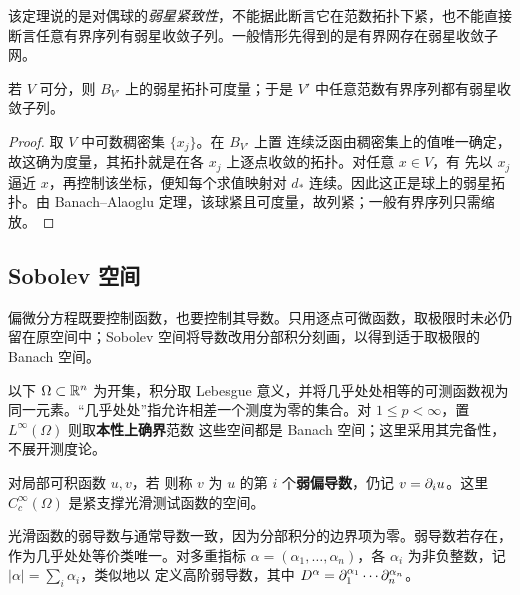 \begin{remark}
    该定理说的是对偶球的\emph{弱星紧致性}，不能据此断言它在范数拓扑下紧，也不能直接断言任意有界序列有弱星收敛子列。一般情形先得到的是有界网存在弱星收敛子网。
\end{remark}

\begin{theorem}
    若 $V$ 可分，则 $B_{V'}$ 上的弱星拓扑可度量；于是 $V'$ 中任意范数有界序列都有弱星收敛子列。
\end{theorem}
\begin{proof}
    取 $V$ 中可数稠密集 $\{x_j\}$。在 $B_{V'}$ 上置
    连续泛函由稠密集上的值唯一确定，故这确为度量，其拓扑就是在各 $x_j$ 上逐点收敛的拓扑。对任意 $x\in V$，有
    先以 $x_j$ 逼近 $x$，再控制该坐标，便知每个求值映射对 $d_*$ 连续。因此这正是球上的弱星拓扑。由 Banach--Alaoglu 定理，该球紧且可度量，故列紧；一般有界序列只需缩放。
\end{proof}

\subsection{Sobolev 空间}\label{sec:sobolev-spaces}

偏微分方程既要控制函数，也要控制其导数。只用逐点可微函数，取极限时未必仍留在原空间中；Sobolev 空间将导数改用分部积分刻画，以得到适于取极限的 Banach 空间。

以下 $\Omega\subset\mathbb{R}^n$ 为开集，积分取 Lebesgue 意义，并将几乎处处相等的可测函数视为同一元素。“几乎处处”指允许相差一个测度为零的集合。对 $1\leqslant p<\infty$，置
$L^\infty(\Omega)$ 则取\textbf{本性上确界}范数
这些空间都是 Banach 空间；这里采用其完备性，不展开测度论。

\begin{definition}\label{def:weak-derivative}
    对局部可积函数 $u,v$，若
    则称 $v$ 为 $u$ 的第 $i$ 个\textbf{弱偏导数}，仍记 $v=\partial_i u$。这里 $C_c^\infty(\Omega)$ 是紧支撑光滑测试函数的空间。
\end{definition}

光滑函数的弱导数与通常导数一致，因为分部积分的边界项为零。弱导数若存在，作为几乎处处等价类唯一。对多重指标 $\alpha=(\alpha_1,\ldots,\alpha_n)$，各 $\alpha_i$ 为非负整数，记 $|\alpha|=\sum_i\alpha_i$，类似地以
定义高阶弱导数，其中 $D^\alpha=\partial_1^{\alpha_1}\cdots\partial_n^{\alpha_n}$。

